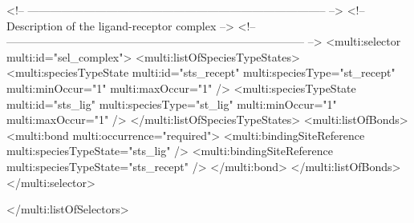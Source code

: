\begin{example}
<!-- -------------------------------------------------------------------------------- -->
<!-- Description of the ligand-receptor complex                                       -->
<!-- -------------------------------------------------------------------------------- -->      
      <multi:selector multi:id="sel_complex">
        <multi:listOfSpeciesTypeStates>
          <multi:speciesTypeState multi:id="sts_recept" multi:speciesType="st_recept" 
                                   multi:minOccur="1" multi:maxOccur="1" />
          <multi:speciesTypeState multi:id="sts_lig" multi:speciesType="st_lig" 
                                   multi:minOccur="1" multi:maxOccur="1" />
        </multi:listOfSpeciesTypeStates>
        <multi:listOfBonds>
          <multi:bond multi:occurrence="required">
            <multi:bindingSiteReference multi:speciesTypeState="sts_lig" />
            <multi:bindingSiteReference multi:speciesTypeState="sts_recept" />
          </multi:bond>
        </multi:listOfBonds>
      </multi:selector>
      
    </multi:listOfSelectors>


\end{example}
